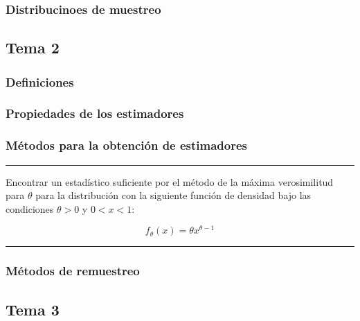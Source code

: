 \documentclass{article}
\begin{document}
			\subsubsection{Distribucinoes de muestreo}
		\subsection{Tema 2}
			\subsubsection{Definiciones}
			\subsubsection{Propiedades de los estimadores}
			\subsubsection{Métodos para la obtención de estimadores}
			
\par \noindent \rule{\textwidth}{0.4pt}

			Encontrar un estadístico suficiente por el método de la máxima verosimilitud para $\theta$ para la distribución con la siguiente función de densidad bajo las condiciones $\theta > 0$ y $0 < x < 1$:
			
			$$
				f_{\theta} (x) = \theta x^{\theta - 1}
			$$
			
\par \noindent \rule{\textwidth}{0.4pt}







			\subsubsection{Métodos de remuestreo}
		\subsection{Tema 3}
\end{document}
